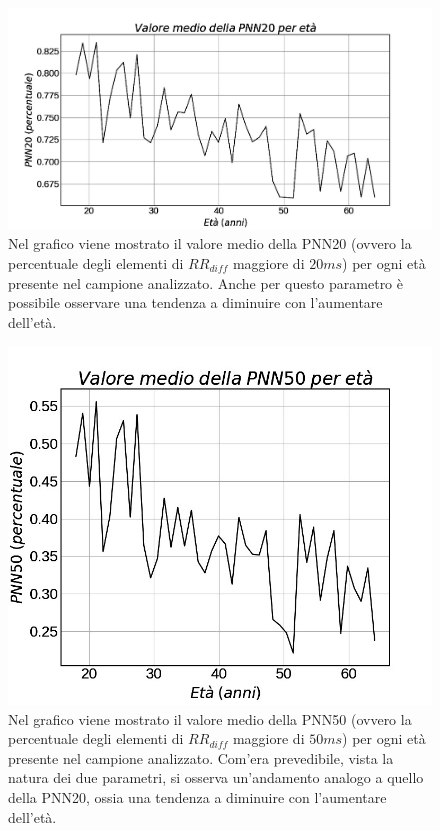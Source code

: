 \documentclass[a4paper, 12pt]{book}
\begin{document}
\begin{figure}[h!]
	\centering
	\includegraphics[width=\textwidth]{PNN20-age.jpg}
	\caption{Nel grafico viene mostrato il valore medio della PNN20 (ovvero la 					percentuale degli elementi di $RR_{diff}$ maggiore di $20ms$) per ogni età presente 	nel campione analizzato.
	Anche per questo parametro è possibile osservare una tendenza a diminuire con 				l'aumentare dell'età.}
	\label{fig:PNN20-age}
\end{figure}

\begin{figure}[h!]
	\centering
	\includegraphics[width=\textwidth]{PNN50-age.jpg}
	\caption{Nel grafico viene mostrato il valore medio della PNN50 (ovvero la 					percentuale degli elementi di $RR_{diff}$ maggiore di $50ms$) per ogni età presente 	nel campione analizzato.
	Com'era prevedibile, vista la natura dei due parametri, si osserva un'andamento 			analogo a quello della PNN20, ossia una tendenza a diminuire con l'aumentare 				dell'età.}
	\label{fig:PNN50-age}
\end{figure}
\end{document}
